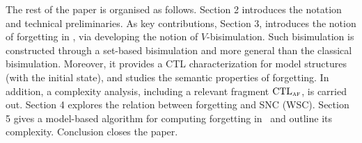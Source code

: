 \documentclass[letterpaper]{article} %
\begin{document}

The rest of the paper is organised as follows. Section 2 introduces the notation and technical preliminaries. As key contributions, Section 3, introduces the notion of forgetting in \CTL, via developing the notion of $V$-bisimulation. Such bisimulation is constructed through a set-based bisimulation and more general than the classical bisimulation. Moreover,  it provides a CTL characterization for model structures (with the initial state), and studies the semantic properties of forgetting. In addition, a complexity analysis, including a relevant fragment  $\textrm{CTL}_{\textsc{a}\textsc{f}}$, is carried out.
Section 4 explores the relation between forgetting and SNC (WSC). Section 5 gives a model-based algorithm for computing forgetting in \CTL\ and outline its complexity. Conclusion closes the paper.
\end{document}
